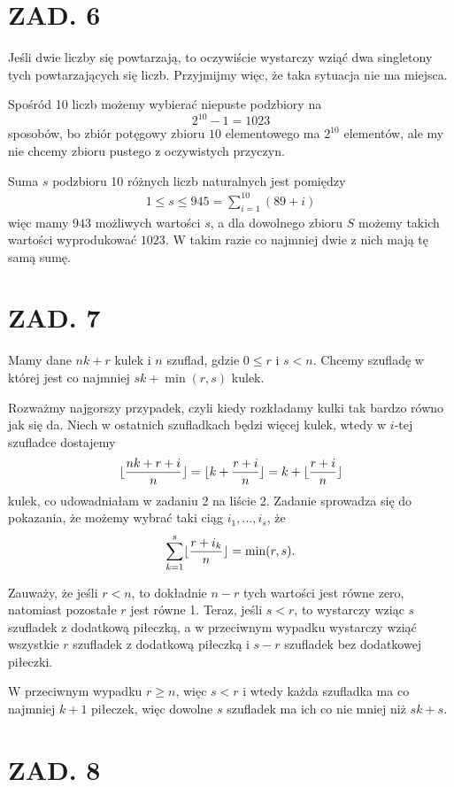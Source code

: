 \documentclass{article}[13pt]
\begin{document}
\section*{ZAD. 6}

Jeśli dwie liczby się powtarzają, to oczywiście wystarczy wziąć dwa singletony tych powtarzających się liczb. Przyjmijmy więc, że taka sytuacja nie ma miejsca.
\smallskip

Spośród 10 liczb możemy wybierać niepuste podzbiory na 
$$2^{10}-1=1023$$ 
sposobów, bo zbiór potęgowy zbioru $10$ elementowego ma $2^{10}$ elementów, ale my nie chcemy zbioru pustego z oczywistych przyczyn.
\smallskip

Suma $s$ podzbioru 10 różnych liczb naturalnych jest pomiędzy
\begin{align*}
    1\leq s\leq 945=\sum\limits_{i=1}^{10}(89+i)
\end{align*}
więc mamy $943$ możliwych wartości $s$, a dla dowolnego zbioru $S$ możemy takich wartości wyprodukować $1023$. W takim razie co najmniej dwie z nich mają tę samą sumę.


\section*{ZAD. 7}

Mamy dane $nk+r$ kulek i $n$ szuflad, gdzie $0\leq r$ i $s<n$. Chcemy szufladę w której jest co najmniej $sk+\min(r,s)$ kulek.
\smallskip

Rozważmy najgorszy przypadek, czyli kiedy rozkładamy kulki tak bardzo równo jak się da. Niech w ostatnich szufladkach będzi więcej kulek, wtedy w $i$-tej szufladce dostajemy
$$\lfloor{nk+r+i\over n}\rfloor=\lfloor k+{r+i\over n}\rfloor=k+\lfloor{r+i\over n}\rfloor$$
kulek, co udowadniałam w zadaniu 2 na liście 2. Zadanie sprowadza się do pokazania, że możemy wybrać taki ciąg $i_1,...,i_s$, że
$$\sum\limits_{k=1}^s\lfloor{r+i_k\over n}\rfloor=\min(r,s).$$

Zauważy, że jeśli $r<n$, to dokładnie $n-r$ tych wartości jest równe zero, natomiast pozostałe $r$ jest równe 1. Teraz, jeśli $s<r$, to wystarczy wziąc $s$ szufladek z dodatkową piłeczką, a w przeciwnym wypadku wystarczy wziąć wszystkie $r$ szufladek z dodatkową piłeczką i $s-r$ szufladek bez dodatkowej piłeczki. 

W przeciwnym wypadku $r\geq n$, więc $s<r$ i wtedy każda szufladka ma co najmniej $k+1$ piłeczek, więc dowolne $s$ szufladek ma ich co nie mniej niż $sk+s$.

\section*{ZAD. 8}
\end{document}
